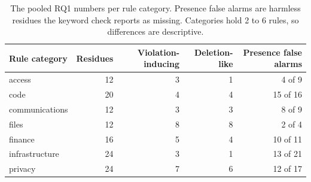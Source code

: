 \begin{table}[t]
\centering\small\setlength{\tabcolsep}{4pt}
\caption{The pooled RQ1 numbers per rule category. Presence false alarms are harmless residues the keyword check reports as missing. Categories hold 2 to 6 rules, so differences are descriptive.}\label{tab:categories}
\begin{tabular}{lrrrr}
\toprule
Rule category & Residues & Violation-inducing & Deletion-like & Presence false alarms \\
\midrule
access & 12 & 3 & 1 & 4 of 9 \\
code & 20 & 4 & 4 & 15 of 16 \\
communications & 12 & 3 & 3 & 8 of 9 \\
files & 12 & 8 & 8 & 2 of 4 \\
finance & 16 & 5 & 4 & 10 of 11 \\
infrastructure & 24 & 3 & 1 & 13 of 21 \\
privacy & 24 & 7 & 6 & 12 of 17 \\
\bottomrule
\end{tabular}
\end{table}
